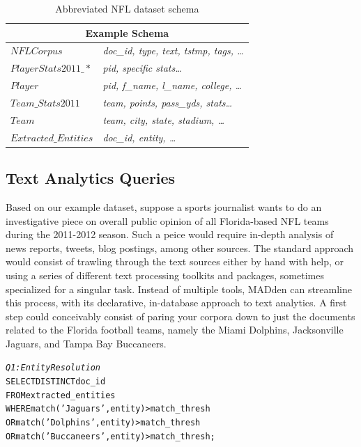 \begin{table}
\begin{center}
\begin{tabular}{|l|l|}
\hline
\multicolumn{2}{|c|}{Example Schema}\\
\hline
$NFLCorpus$ & \textit{doc\_id, type, text, tstmp, tags, \ldots}\\
\hline
$PlayerStats2011\_*$ & \textit{pid, specific stats\ldots }\\
\hline
$Player$ & \textit{pid, f\_name, l\_name, college, \ldots}\\
\hline
$Team\_Stats2011$ & \textit{team, points, pass\_yds, stats\ldots}\\
\hline
$Team$ & \textit{team, city, state, stadium, \ldots}\\
\hline
$Extracted\_Entities$ & \textit{doc\_id, entity, \ldots} \\
\hline

\end{tabular}
\end{center}
\caption{Abbreviated NFL dataset schema}
\label{tab:madschema}
\end{table}

\subsection{Text Analytics Queries}
Based on our example dataset, suppose a sports journalist
wants to do an investigative piece on overall public opinion 
of all Florida-based NFL teams during the 2011-2012 season. 
Such a peice would require in-depth analysis of news reports,
tweets, blog postings, among other sources. The standard approach would
consist of trawling through the text sources either by hand
with help, or using a series of different text processing
toolkits and packages, sometimes specialized for a singular 
task. Instead of multiple tools, MADden can streamline this process, with its
declarative, in-database approach to text analytics. A first step could 
conceivably consist of paring your corpora down to just
the documents related to the Florida football teams, namely
the Miami Dolphins, Jacksonville Jaguars, and Tampa Bay Buccaneers. 

\begin{small}
\begin{alltt}
\textit{Q1: Entity Resolution}
SELECT DISTINCT doc_id
FROM extracted_entities
WHERE match('Jaguars', entity) > match\_thresh
   OR match('Dolphins', entity) > match\_thresh
   OR match('Buccaneers', entity) > match\_thresh;
\end{alltt}
\end{small}

